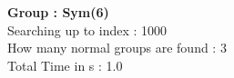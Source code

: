 \textbf{Group : Sym(6)}\\
Searching up to index : 1000\\
How many normal groups are found : 3\\
Total Time in s : 1.0\\
